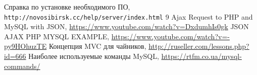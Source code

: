 \begin{thebibliography}{99999}
{}
\singlespace\normalsize

 Справка по установке необходимого ПО,  \texttt{http://novosibirsk.cc/help/server/index.html}
\hfill
{} 9 Ajax Request to PHP and MySQL with JSON, \url{https://www.youtube.com/watch?v=DxdumhIs0gk}
\hfill
{} JSON AJAX PHP MYSQL EXAMPLE, \url{https://www.youtube.com/watch?v=-py9HOhuzTE}
\hfill
{} Концепция MVC для чайников, \url{http://ruseller.com/lessons.php?id=666}
\hfill
{} Наиболее используемые команды MySQL, \url{https://rtfm.co.ua/mysql-commands/}

\end{thebibliography}
